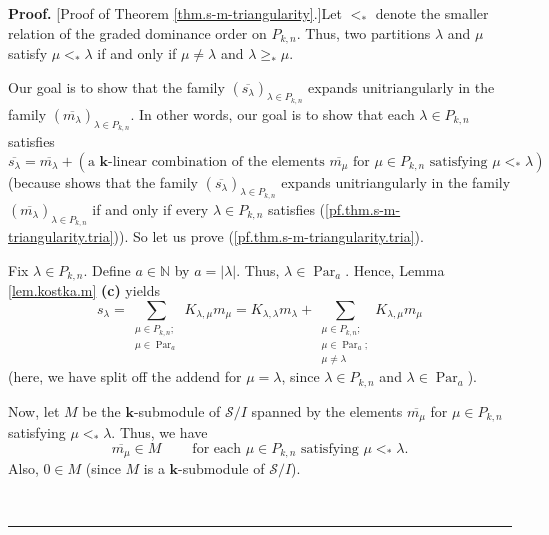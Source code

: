 \documentclass[numbers=enddot,12pt,final,onecolumn,notitlepage]{scrartcl}%
\theoremstyle{definition}
\newenvironment{proof}[1][Proof]{\noindent\textbf{#1.} }{\ \rule{0.5em}{0.5em}}
\let\sumnonlimits\sum
\renewcommand{\sum}{\sumnonlimits\limits}
\begin{document}
\begin{proof}
[Proof of Theorem \ref{thm.s-m-triangularity}.]Let $<_{\ast}$ denote the
smaller relation of the graded dominance order on $P_{k,n}$. Thus, two
partitions $\lambda$ and $\mu$ satisfy $\mu<_{\ast}\lambda$ if and only if
$\mu\neq\lambda$ and $\lambda\geq_{\ast}\mu$.

Our goal is to show that the family $\left(  \overline{s_{\lambda}}\right)
_{\lambda\in P_{k,n}}$ expands unitriangularly in the family $\left(
\overline{m_{\lambda}}\right)  _{\lambda\in P_{k,n}}$. In other words, our
goal is to show that each $\lambda\in P_{k,n}$ satisfies%
\begin{equation}
\overline{s_{\lambda}}=\overline{m_{\lambda}}+\left(  \text{a }\mathbf{k}%
\text{-linear combination of the elements }\overline{m_{\mu}}\text{ for }%
\mu\in P_{k,n}\text{ satisfying }\mu<_{\ast}\lambda\right)
\label{pf.thm.s-m-triangularity.tria}%
\end{equation}
(because \cite[Remark 11.1.17(c)]{GriRei18} shows that the family $\left(
\overline{s_{\lambda}}\right)  _{\lambda\in P_{k,n}}$ expands unitriangularly
in the family $\left(  \overline{m_{\lambda}}\right)  _{\lambda\in P_{k,n}}$
if and only if every $\lambda\in P_{k,n}$ satisfies
(\ref{pf.thm.s-m-triangularity.tria})). So let us prove
(\ref{pf.thm.s-m-triangularity.tria}).

Fix $\lambda\in P_{k,n}$. Define $a\in\mathbb{N}$ by $a=\left\vert
\lambda\right\vert $. Thus, $\lambda\in\operatorname*{Par}\nolimits_{a}$.
Hence, Lemma \ref{lem.kostka.m} \textbf{(c)} yields%
\begin{equation}
s_{\lambda}=\sum_{\substack{\mu\in P_{k,n};\\\mu\in\operatorname*{Par}%
\nolimits_{a}}}K_{\lambda,\mu}m_{\mu}=K_{\lambda,\lambda}m_{\lambda}%
+\sum_{\substack{\mu\in P_{k,n};\\\mu\in\operatorname*{Par}\nolimits_{a}%
;\\\mu\neq\lambda}}K_{\lambda,\mu}m_{\mu} \label{pf.thm.s-m-triangularity.3}%
\end{equation}
(here, we have split off the addend for $\mu=\lambda$, since $\lambda\in
P_{k,n}$ and $\lambda\in\operatorname*{Par}\nolimits_{a}$).

Now, let $M$ be the $\mathbf{k}$-submodule of $\mathcal{S}/I$ spanned by the
elements $\overline{m_{\mu}}$ for $\mu\in P_{k,n}$ satisfying $\mu<_{\ast
}\lambda$. Thus, we have%
\begin{equation}
\overline{m_{\mu}}\in M\ \ \ \ \ \ \ \ \ \ \text{for each }\mu\in
P_{k,n}\text{ satisfying }\mu<_{\ast}\lambda.
\label{pf.thm.s-m-triangularity.inM}%
\end{equation}
Also, $0\in M$ (since $M$ is a $\mathbf{k}$-submodule of $\mathcal{S}/I$).


\end{proof}
\end{document}
